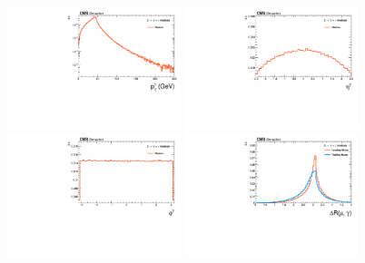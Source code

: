 \begin{figure}[!htbp]
\begin{center}
\includegraphics[width=0.45\textwidth]{figures_and_tables/outputPlots/ZtoUpsilon_Cat0_ZZZZZ/mc/unpolarized/h_Gen_Photon_pt}
\includegraphics[width=0.45\textwidth]{figures_and_tables/outputPlots/ZtoUpsilon_Cat0_ZZZZZ/mc/unpolarized/h_Gen_Photon_eta}
\includegraphics[width=0.45\textwidth]{figures_and_tables/outputPlots/ZtoUpsilon_Cat0_ZZZZZ/mc/unpolarized/h_Gen_Photon_phi}
\includegraphics[width=0.45\textwidth]{figures_and_tables/outputPlots/ZtoUpsilon_Cat0_ZZZZZ/mc/unpolarized/h_Gen_deltaR_Mu_Photon}

\end{center}
\end{figure}
